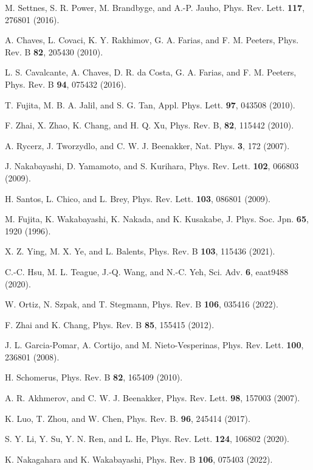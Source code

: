 \documentclass{jpsj3}
\begin{document}
\begin{thebibliography}{99}
M. Settnes, S. R. Power, M. Brandbyge, and A.-P. Jauho, Phys. Rev. Lett. {\bf 117}, 276801 (2016).


A. Chaves, L. Covaci, 
K. Y. Rakhimov, 
G. A. Farias, and 
F. M. Peeters, Phys. Rev. B
{\bf 82}, 205430 (2010).

L. S. Cavalcante, A. Chaves, 
D. R. da Costa, 
G. A. Farias, and 
F. M. Peeters, 
Phys. Rev. B {\bf 94}, 075432 (2016).

T. Fujita, M. B. A. Jalil, and S. G. Tan, Appl. Phys. Lett. {\bf 97}, 043508 (2010).


 F. Zhai, X. Zhao, K. Chang, and H. Q. Xu, Phys. Rev. B, {\bf 82}, 115442 (2010).


 A. Rycerz, J. Tworzydlo, and C. W. J. Beenakker, Nat. Phys. {\bf 3}, 172 (2007).

 J. Nakabayashi, D. Yamamoto, and S. Kurihara, Phys. Rev. Lett. {\bf 102}, 066803 (2009).


 H. Santos, L. Chico, and L. Brey, Phys. Rev. Lett. {\bf 103}, 086801 (2009).

 M. Fujita, K. Wakabayashi, K. Nakada, and K. Kusakabe, J. Phys. Soc. Jpn. {\bf 65}, 1920 (1996).

%

X. Z. Ying, M. X. Ye, and L. Balents, Phys. Rev. B {\bf 103}, 115436 (2021).

C.-C. Hsu, M. L. Teague, J.-Q. Wang, and N.-C. Yeh, Sci. Adv. {\bf 6}, eaat9488 (2020).


 W. Ortiz, N. Szpak, and T. Stegmann, Phys. Rev. B {\bf 106}, 035416 (2022).

 F. Zhai and K. Chang, Phys. Rev. B {\bf 85}, 155415 (2012).

J. L. Garcia-Pomar, A. Cortijo, and M. Nieto-Vesperinas, Phys. Rev. Lett. {\bf 100}, 236801 (2008).

H. Schomerus, Phys. Rev. B {\bf 82}, 165409 (2010).

A. R. Akhmerov, and C. W. J. Beenakker, Phys. Rev. Lett. {\bf 98}, 157003 (2007).

K. Luo, T. Zhou, and W. Chen, Phys. Rev. B. {\bf 96}, 245414 (2017).

S. Y. Li, Y. Su, Y. N. Ren, and L. He, Phys. Rev. Lett. {\bf 124}, 106802 (2020).

K. Nakagahara and K. Wakabayashi, Phys. Rev. B {\bf 106}, 075403 (2022).


\end{thebibliography}
\end{document}
